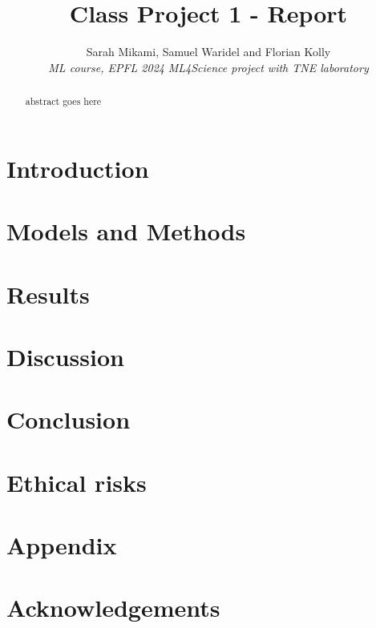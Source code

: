 \documentclass[10pt,conference,compsocconf]{IEEEtran}
\begin{document}
\title{Class Project 1 - Report}

\author{
  Sarah Mikami, Samuel Waridel and Florian Kolly \\
  \textit{ML course, EPFL 2024}
  \textit{ML4Science project with TNE laboratory}
}

\maketitle

\begin{abstract}
  abstract goes here
\end{abstract}

\section{Introduction}

\cite{Glaser.etal2020a}


\section{Models and Methods}




\section{Results}



\section{Discussion}


\section{Conclusion}


\section{Ethical risks}




\section{Appendix}



\section*{Acknowledgements}



\end{document}
